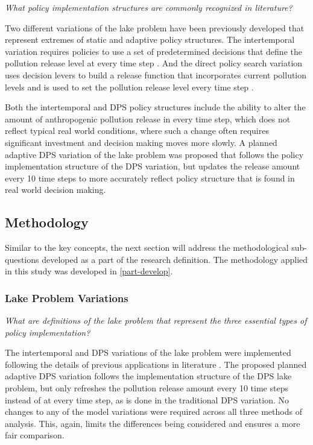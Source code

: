         \textit{What policy implementation structures are commonly recognized in literature?}
        
        Two different variations of the lake problem have been previously developed that represent extremes of static and adaptive policy structures. The intertemporal variation requires policies to use a set of predetermined decisions that define the pollution release level at every time step \citep{Ward2015}. And the direct policy search variation uses decision levers to build a release function that incorporates current pollution levels and is used to set the pollution release level every time step \citep{Quinn2017}. 
        
        Both the intertemporal and DPS policy structures include the ability to alter the amount of anthropogenic pollution release in every time step, which does not reflect typical real world conditions, where such a change often requires significant investment and decision making moves more slowly. A planned adaptive DPS variation of the lake problem was proposed that follows the policy implementation structure of the DPS variation, but updates the release amount every 10 time steps to more accurately reflect policy structure that is found in real world decision making. 
    
    \subsection{Methodology}
    Similar to the key concepts, the next section will address the methodological sub-questions developed as a part of the research definition. The methodology applied in this study was developed in \cref{part-develop}. 
        
        \subsubsection{Lake Problem Variations}
        \textit{What are definitions of the lake problem that represent the three essential types of policy implementation?}
        
        The intertemporal and DPS variations of the lake problem were implemented following the details of previous applications in literature \citep{Kwakkel2017, Quinn2017, Singh2015, Ward2015}. The proposed planned adaptive DPS variation follows the implementation structure of the DPS lake problem, but only refreshes the pollution release amount every 10 time steps instead of at every time step, as is done in the traditional DPS variation. No changes to any of the model variations were required across all three methods of analysis. This, again, limits the differences being considered and ensures a more fair comparison. 
        
